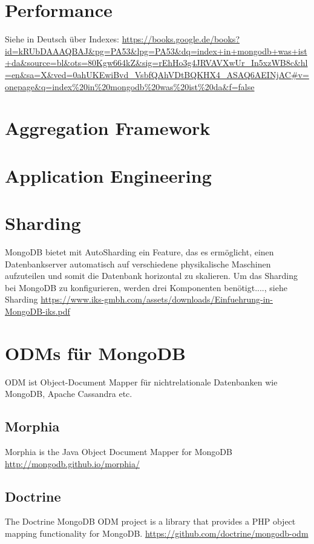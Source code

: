 \section{Performance}
Siehe in Deutsch über Indexes: \url{https://books.google.de/books?id=kRUbDAAAQBAJ&pg=PA53&lpg=PA53&dq=index+in+mongodb+was+ist+da&source=bl&ots=80Kgw664kZ&sig=rEhHo3g4JRVAVXwUr_In5xzWB8c&hl=en&sa=X&ved=0ahUKEwiBvd_VsbfQAhVDtBQKHX4_ASAQ6AEINjAC#v=onepage&q=index%20in%20mongodb%20was%20ist%20da&f=false}\newline

\section{Aggregation Framework}
\section{Application Engineering}

\section{Sharding}
MongoDB bietet mit AutoSharding ein Feature, das es ermöglicht, einen Datenbankserver automatisch auf verschiedene physikalische Maschinen aufzuteilen und somit die Datenbank horizontal zu skalieren. Um das Sharding bei MongoDB zu konfigurieren, werden drei Komponenten benötigt...., siehe Sharding \url{https://www.iks-gmbh.com/assets/downloads/Einfuehrung-in-MongoDB-iks.pdf
}



\section{ODMs für MongoDB}

ODM ist Object-Document Mapper für nichtrelationale Datenbanken wie MongoDB, Apache Cassandra etc.

\subsection{Morphia}
Morphia is the Java Object Document Mapper for MongoDB \url{http://mongodb.github.io/morphia/}

\subsection{Doctrine}
The Doctrine MongoDB ODM project is a library that provides a PHP object mapping functionality for MongoDB. \url{https://github.com/doctrine/mongodb-odm}

